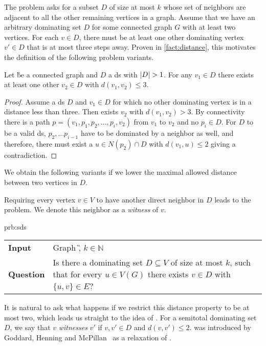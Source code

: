 The \dom problem asks for a subset $D$ of size at most $k$ whose set of neighbors are adjacent to all the other remaining vertices in a graph.
Assume that we have an arbitrary dominating set $D$ for some connected graph $G$ with at least two vertices.
For each $v \in D$, there must be at least one other dominating vertex $v' \in D$ that is at most three steps away.
Proven in \cref{fact:distance}, this motivates the definition of the following problem variants.

\begin{fact}\label{fact:distance} Let \G be a connected graph and $D$ a ds with $\abs{D} > 1$. 
For any $v_1 \in D$ there exists at least one other $v_2 \in D$ with $d(v_1,v_2) \leq 3$.
\end{fact}
\begin{proof}

Assume a ds $D$ and $v_1 \in D$ for which no other dominating vertex is in a distance less than three.
Then exists $v_2$ with $d(v_1,v_2) > 3$. 
By connectivity there is a path $p = (v_1, p_1, p_2, ...,  p_i, v_2)$ from $v_1$ to $v_2$ and no $p_i \in D $. 
For $D$ to be a valid ds, $p_2,...p_{i-1}$ have to be dominated by a neighbor as well, and therefore, there must exist a $u \in N(p_2) \cap D$ with $d(v_1, u) \leq 2$ giving a contradiction.
\end{proof}
We obtain the following variants if we lower the maximal allowed distance between two vertices in $D$.

Requiring every vertex $v \in V$ to have another direct neighbor in $D$ leads to the \tdom problem. 
We denote this neighbor as a \textit{witness} of $v$.

\begin{prb}{prb:sds}
    \begin{tabularx}{1.0\textwidth}{>{\hsize=0.30\hsize}X>{\hsize=0.8\hsize}X}
        \textbf{Input} & Graph \G, $k \in \mathbb{N}$\\
        \textbf{Question} & Is there a dominating set $D \subseteq V$ of size at most $k$, such that for every $u \in V(G)$ there exists $v \in D$ with $\{u,v\} \in E$? \\
    \end{tabularx}
\end{prb}

It is natural to ask what happens if we restrict this distance property to be at most two, which leads us straight to the idea of \sdomin.
For a semitotal dominating set $D$, we say that $v$ \emph{witnesses} $v'$ if $v, v' \in D$ and $d(v,v') \leq 2$.
\sdomin was introduced by Goddard, Henning and McPillan~\cite{Goddard2014} as a relaxation of \tdomin. 

